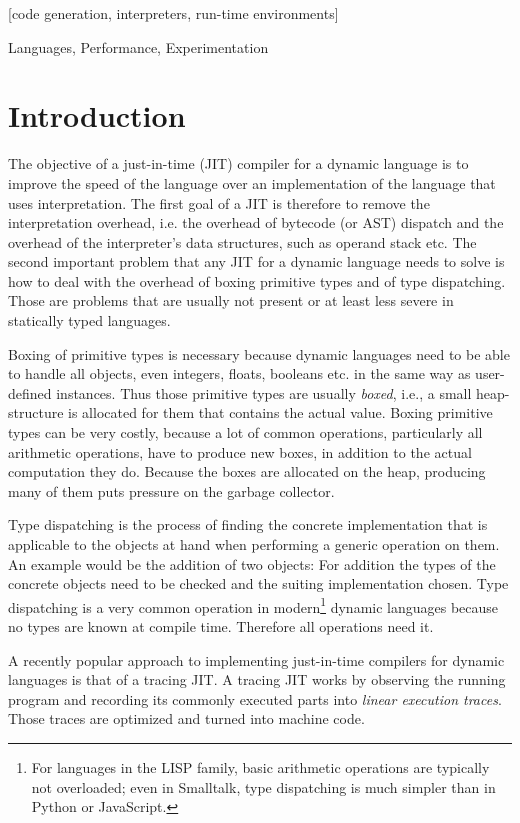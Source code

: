 \documentclass{sigplanconf}
\newcommand\ie{i.e.,\xspace}
\begin{document}
[code generation,
interpreters, run-time environments]

\terms
Languages, Performance, Experimentation


\section{Introduction}

The objective of a just-in-time (JIT) compiler for a dynamic language is to
improve the speed of the language over an implementation of the language that
uses interpretation. The first goal of a JIT is therefore to remove the
interpretation overhead, i.e. the overhead of bytecode (or AST) dispatch and the
overhead of the interpreter's data structures, such as operand stack etc. The
second important problem that any JIT for a dynamic language needs to solve is
how to deal with the overhead of boxing primitive types and of type
dispatching. Those are problems that are usually not present or at least less
severe in statically typed languages.

Boxing of primitive types is necessary because dynamic languages need to be able to handle
all objects, even integers, floats, booleans etc. in the same way as user-defined
instances. Thus those primitive types are usually \emph{boxed}, \ie a small
heap-structure is allocated for them that contains the actual value. Boxing
primitive types can be very costly, because a lot of common operations,
particularly all arithmetic operations, have to produce new boxes, in addition
to the actual computation they do. Because the boxes are allocated on the heap,
producing many of them puts pressure on the garbage collector.

Type dispatching is the process of finding the concrete implementation that is
applicable to the objects at hand when performing a generic operation on them. An
example would be the addition of two objects: For addition the types of the
concrete objects need to be checked and the suiting implementation chosen.
Type dispatching is a very common operation in
modern\footnote{For languages in the LISP family, basic arithmetic operations
are typically not overloaded; even in Smalltalk, type dispatching is much
simpler than in Python or JavaScript.}
dynamic languages because no types are known at compile time. Therefore all
operations need it.

A recently popular approach to implementing just-in-time compilers for dynamic
languages is that of a tracing JIT. A tracing JIT works by observing the running
program and recording its commonly executed parts into \emph{linear execution traces}. Those
traces are optimized and turned into machine code.
\end{document}
